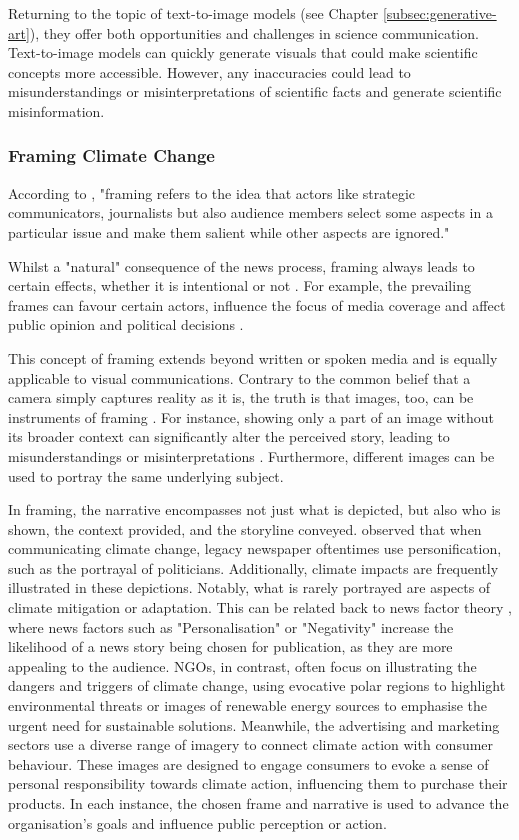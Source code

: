 Returning to the topic of text-to-image models (see Chapter \ref{subsec:generative-art}), they offer both opportunities and challenges in science communication.  Text-to-image models can quickly generate visuals that could make scientific concepts more accessible. However, any inaccuracies could lead to misunderstandings or misinterpretations of scientific facts and generate scientific misinformation.

\subsubsection{Framing Climate Change}

According to \textcite{Sikorski2020}, "framing refers to the idea that actors like strategic communicators, journalists but also audience members select some aspects in a particular issue and make them salient while other aspects are ignored."

Whilst a "natural" consequence of the news process, framing always leads to certain effects, whether it is intentional or not \parencite[91]{ONeill2022}. For example, the prevailing frames can favour certain actors, influence the focus of media coverage and affect public opinion and political decisions \parencite{Nisbet2006}. 

This concept of framing extends beyond written or spoken media and is equally applicable to visual communications. Contrary to the common belief that a camera simply captures reality as it is, the truth is that images, too, can be instruments of framing \parencite[74]{ONeill2014}. For instance, showing only a part of an image without its broader context can significantly alter the perceived story, leading to misunderstandings or misinterpretations \parencite{Fleming2021}. Furthermore, different images can be used to portray the same underlying subject.

In framing, the narrative encompasses not just what is depicted, but also who is shown, the context provided, and the storyline conveyed.  \textcite{ONeill2014} observed that when communicating climate change, legacy newspaper oftentimes use personification, such as the portrayal of politicians. Additionally, climate impacts are frequently illustrated in these depictions. Notably, what is rarely portrayed are aspects of climate mitigation or adaptation. This can be related back to news factor theory \parencite{Galtung1965}, where news factors such as "Personalisation" or "Negativity" increase the likelihood of a news story being chosen for publication, as they are more appealing to the audience. NGOs, in contrast, often focus on illustrating the dangers and triggers of climate change, using evocative polar regions to highlight environmental threats or images of renewable energy sources to emphasise the urgent need for sustainable solutions. Meanwhile, the advertising and marketing sectors use a diverse range of imagery to connect climate action with consumer behaviour. These images are designed to engage consumers to evoke a sense of personal responsibility towards climate action, influencing them to purchase their products. In each instance, the chosen frame and narrative is used to advance the organisation's goals and influence public perception or action.

